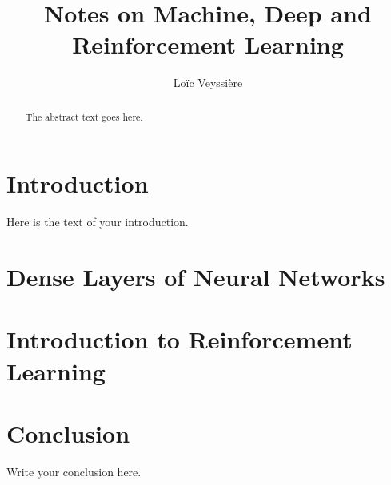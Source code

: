 \documentclass{article}
\begin{document}
\title{Notes on Machine, Deep and Reinforcement Learning}
\author{Loïc Veyssière}

\maketitle

\begin{abstract}
The abstract text goes here.
\end{abstract}

\section{Introduction}
Here is the text of your introduction.

\section{Dense Layers of Neural Networks}


\section{Introduction to Reinforcement Learning}


\section{Conclusion}
Write your conclusion here.
\end{document}
